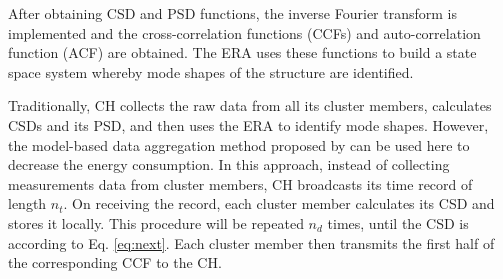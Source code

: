 After obtaining CSD and PSD functions, the inverse Fourier transform is implemented and the cross-correlation functions (CCFs) and auto-correlation function (ACF) are obtained.  The ERA uses these functions to build a state space system whereby mode shapes of the structure are identified.

Traditionally, CH collects the raw data from all its cluster members, calculates CSDs and its PSD, and then uses the ERA to identify mode shapes.  However, the model-based data aggregation method proposed by \cite{nagayama2008structural} can be used here to decrease the energy consumption. In this approach, instead of collecting measurements data from cluster members, CH broadcasts its time record of length \(n_t\). On receiving the record, each cluster member calculates its CSD and stores it locally.  This procedure will be repeated \(n_d\) times, until the CSD is according to Eq. \ref{eq:next}. Each cluster member then transmits the first half of the corresponding CCF to the CH.
\begin{comment}
\begin{figure}
	\centering
		\texttt{[image: clusteraggregation.eps]}
	\caption{Model-based data aggregation (Assume 50 \% Overlap)}
	\label{fig:clusteraggregation}
\end{figure}
\end{comment}

